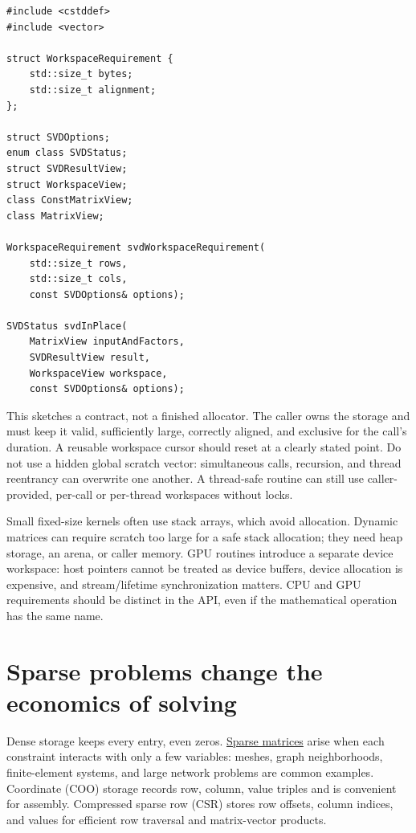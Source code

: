 \begin{verbatim}
#include <cstddef>
#include <vector>

struct WorkspaceRequirement {
    std::size_t bytes;
    std::size_t alignment;
};

struct SVDOptions;
enum class SVDStatus;
struct SVDResultView;
struct WorkspaceView;
class ConstMatrixView;
class MatrixView;

WorkspaceRequirement svdWorkspaceRequirement(
    std::size_t rows,
    std::size_t cols,
    const SVDOptions& options);

SVDStatus svdInPlace(
    MatrixView inputAndFactors,
    SVDResultView result,
    WorkspaceView workspace,
    const SVDOptions& options);
\end{verbatim}

This sketches a contract, not a finished allocator. The caller owns the storage and must keep it valid, sufficiently large, correctly aligned, and exclusive for the call's duration. A reusable workspace cursor should reset at a clearly stated point. Do not use a hidden global scratch vector: simultaneous calls, recursion, and thread reentrancy can overwrite one another. A thread-safe routine can still use caller-provided, per-call or per-thread workspaces without locks.

Small fixed-size kernels often use stack arrays, which avoid allocation. Dynamic matrices can require scratch too large for a safe stack allocation; they need heap storage, an arena, or caller memory. GPU routines introduce a separate device workspace: host pointers cannot be treated as device buffers, device allocation is expensive, and stream/lifetime synchronization matters. CPU and GPU requirements should be distinct in the API, even if the mathematical operation has the same name.

\section{Sparse problems change the economics of solving}\label{02-foundations-ii-ch038-sparse-problems-change-the-economics-of-solving}

\hypertarget{02-foundations-ii-ch038-sparse-problems-change-the-economics-of-solving}{}

Dense storage keeps every entry, even zeros. \hyperref[02-foundations-ii-ch038-sparse-storage-changes-the-cost-model]{Sparse matrices} arise when each constraint interacts with only a few variables: meshes, graph neighborhoods, finite-element systems, and large network problems are common examples. Coordinate (COO) storage records row, column, value triples and is convenient for assembly. Compressed sparse row (CSR) stores row offsets, column indices, and values for efficient row traversal and matrix-vector products.

